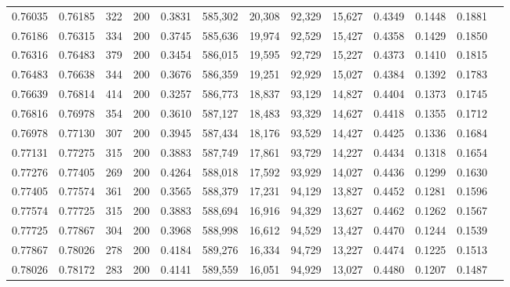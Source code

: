 \begin{tabular}{rrrrrrrrrrrrr}
0.76035 & 0.76185 &   322 & 200 &                                     0.3831 & 585,302 &  20,308 &  92,329 &  15,627 & 0.4349 & 0.1448 & 0.1881 \\
0.76186 & 0.76315 &   334 & 200 &                                     0.3745 & 585,636 &  19,974 &  92,529 &  15,427 & 0.4358 & 0.1429 & 0.1850 \\
0.76316 & 0.76483 &   379 & 200 &                                     0.3454 & 586,015 &  19,595 &  92,729 &  15,227 & 0.4373 & 0.1410 & 0.1815 \\
0.76483 & 0.76638 &   344 & 200 &                                     0.3676 & 586,359 &  19,251 &  92,929 &  15,027 & 0.4384 & 0.1392 & 0.1783 \\
0.76639 & 0.76814 &   414 & 200 &                                     0.3257 & 586,773 &  18,837 &  93,129 &  14,827 & 0.4404 & 0.1373 & 0.1745 \\
0.76816 & 0.76978 &   354 & 200 &                                     0.3610 & 587,127 &  18,483 &  93,329 &  14,627 & 0.4418 & 0.1355 & 0.1712 \\
0.76978 & 0.77130 &   307 & 200 &                                     0.3945 & 587,434 &  18,176 &  93,529 &  14,427 & 0.4425 & 0.1336 & 0.1684 \\
0.77131 & 0.77275 &   315 & 200 &                                     0.3883 & 587,749 &  17,861 &  93,729 &  14,227 & 0.4434 & 0.1318 & 0.1654 \\
0.77276 & 0.77405 &   269 & 200 &                                     0.4264 & 588,018 &  17,592 &  93,929 &  14,027 & 0.4436 & 0.1299 & 0.1630 \\
0.77405 & 0.77574 &   361 & 200 &                                     0.3565 & 588,379 &  17,231 &  94,129 &  13,827 & 0.4452 & 0.1281 & 0.1596 \\
0.77574 & 0.77725 &   315 & 200 &                                     0.3883 & 588,694 &  16,916 &  94,329 &  13,627 & 0.4462 & 0.1262 & 0.1567 \\
0.77725 & 0.77867 &   304 & 200 &                                     0.3968 & 588,998 &  16,612 &  94,529 &  13,427 & 0.4470 & 0.1244 & 0.1539 \\
0.77867 & 0.78026 &   278 & 200 &                                     0.4184 & 589,276 &  16,334 &  94,729 &  13,227 & 0.4474 & 0.1225 & 0.1513 \\
0.78026 & 0.78172 &   283 & 200 &                                     0.4141 & 589,559 &  16,051 &  94,929 &  13,027 & 0.4480 & 0.1207 & 0.1487 \\

\end{tabular}
